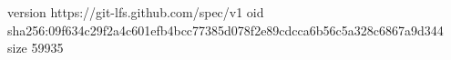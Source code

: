 version https://git-lfs.github.com/spec/v1
oid sha256:09f634c29f2a4c601efb4bcc77385d078f2e89cdcca6b56c5a328c6867a9d344
size 59935
